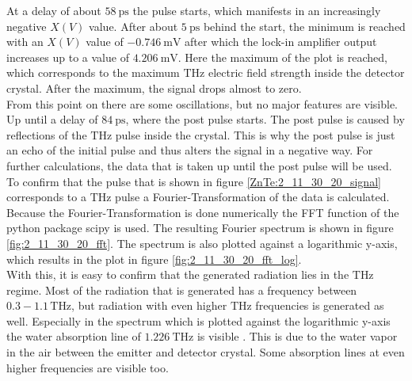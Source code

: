 At a delay of about $\SI{58}{\pico\second}$ the pulse starts, which manifests in an increasingly negative $X(V)$ value.
After about $\SI{5}{\pico\second}$ behind the start, the minimum is reached with an $X(V)$ value of $\SI{-0.746}{\milli\V}$ after which the lock-in amplifier output increases up to a value of $\SI{4.206}{\milli\V}$.
Here the maximum of the plot is reached, which corresponds to the maximum $\si{\tera\hertz}$ electric field strength inside the detector crystal.
After the maximum, the signal drops almost to zero.
\\
From this point on there are some oscillations, but no major features are visible. %
Up until a delay of $\SI{84}{\pico\second}$, where the post pulse starts.
The post pulse is caused by reflections of the $\si{\tera\hertz}$ pulse inside the crystal.
This is why the post pulse is just an echo of the initial pulse and thus alters the signal in a negative way.
For further calculations, the data that is taken up until the post pulse will be used.
\\
\FloatBarrier
To confirm that the pulse that is shown in figure \ref{ZnTe:2_11_30_20_signal} corresponds to a $\si{\tera\hertz}$ pulse a Fourier-Transformation of the data is calculated. %
Because the Fourier-Transformation is done numerically the FFT function of the python package scipy \cite{scipy} is used.
The resulting Fourier spectrum is shown in figure \ref{fig:2_11_30_20_fft}.
The spectrum is also plotted against a logarithmic y-axis, which results in the plot in figure \ref{fig:2_11_30_20_fft_log}.
\\
With this, it is easy to confirm that the generated radiation lies in the $\si{\tera\hertz}$ regime.
Most of the radiation that is generated has a frequency between $0.3-1.1\,\si{\tera\hertz}$, but radiation with even higher $\si{\tera\hertz}$ frequencies is generated as well.
Especially in the spectrum which is plotted against the logarithmic y-axis the water absorption line of $\SI{1.226}{\tera\hertz}$ is visible \cite{water_absorption}.
This is due to the water vapor in the air between the emitter and detector crystal.
Some absorption lines at even higher frequencies are visible too.
